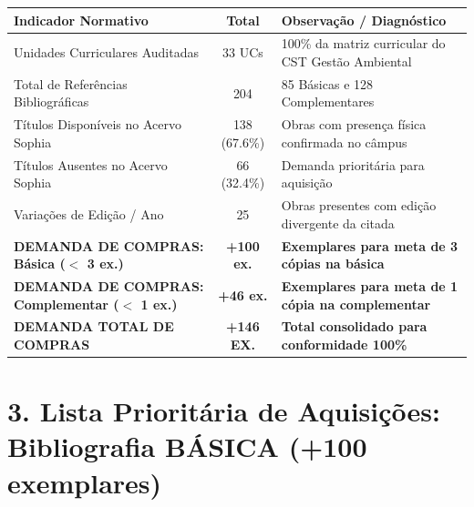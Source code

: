 \documentclass[11pt,a4paper]{article}
\begin{document}
\begin{table}[h!]
\centering
\begin{tabularx}{\linewidth}{|X|c|X|}
\hline
\textbf{Indicador Normativo} & \textbf{Total} & \textbf{Observação / Diagnóstico} \\ \hline
Unidades Curriculares Auditadas & 33 UCs & 100\% da matriz curricular do CST Gestão Ambiental \\ \hline
Total de Referências Bibliográficas & 204 & 85 Básicas e 128 Complementares \\ \hline
Títulos Disponíveis no Acervo Sophia & 138 (67.6\%) & Obras com presença física confirmada no câmpus \\ \hline
Títulos Ausentes no Acervo Sophia & 66 (32.4\%) & Demanda prioritária para aquisição \\ \hline
Variações de Edição / Ano & 25 & Obras presentes com edição divergente da citada \\ \hline
\textbf{DEMANDA DE COMPRAS: Básica ($<$ 3 ex.)} & \textbf{+100 ex.} & \textbf{Exemplares para meta de 3 cópias na básica} \\ \hline
\textbf{DEMANDA DE COMPRAS: Complementar ($<$ 1 ex.)} & \textbf{+46 ex.} & \textbf{Exemplares para meta de 1 cópia na complementar} \\ \hline
\textbf{DEMANDA TOTAL DE COMPRAS} & \textbf{\textcolor{ifscgreen}{+146 EX.}} & \textbf{Total consolidado para conformidade 100\%} \\ \hline
\end{tabularx}
\end{table}

\newpage
\section*{3. Lista Prioritária de Aquisições: Bibliografia BÁSICA (+100 exemplares)}
\end{document}

